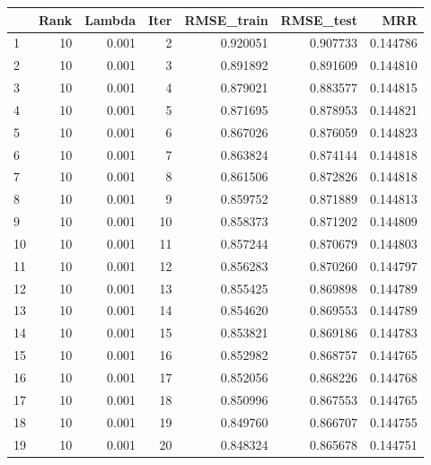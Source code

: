 \begin{tabular}{lrrrrrr}
\toprule
{} &  Rank &  Lambda &  Iter &  RMSE\_train &  RMSE\_test &       MRR \\
\midrule
1  &    10 &   0.001 &     2 &    0.920051 &   0.907733 &  0.144786 \\
2  &    10 &   0.001 &     3 &    0.891892 &   0.891609 &  0.144810 \\
3  &    10 &   0.001 &     4 &    0.879021 &   0.883577 &  0.144815 \\
4  &    10 &   0.001 &     5 &    0.871695 &   0.878953 &  0.144821 \\
5  &    10 &   0.001 &     6 &    0.867026 &   0.876059 &  0.144823 \\
6  &    10 &   0.001 &     7 &    0.863824 &   0.874144 &  0.144818 \\
7  &    10 &   0.001 &     8 &    0.861506 &   0.872826 &  0.144818 \\
8  &    10 &   0.001 &     9 &    0.859752 &   0.871889 &  0.144813 \\
9  &    10 &   0.001 &    10 &    0.858373 &   0.871202 &  0.144809 \\
10 &    10 &   0.001 &    11 &    0.857244 &   0.870679 &  0.144803 \\
11 &    10 &   0.001 &    12 &    0.856283 &   0.870260 &  0.144797 \\
12 &    10 &   0.001 &    13 &    0.855425 &   0.869898 &  0.144789 \\
13 &    10 &   0.001 &    14 &    0.854620 &   0.869553 &  0.144789 \\
14 &    10 &   0.001 &    15 &    0.853821 &   0.869186 &  0.144783 \\
15 &    10 &   0.001 &    16 &    0.852982 &   0.868757 &  0.144765 \\
16 &    10 &   0.001 &    17 &    0.852056 &   0.868226 &  0.144768 \\
17 &    10 &   0.001 &    18 &    0.850996 &   0.867553 &  0.144765 \\
18 &    10 &   0.001 &    19 &    0.849760 &   0.866707 &  0.144755 \\
19 &    10 &   0.001 &    20 &    0.848324 &   0.865678 &  0.144751 \\
\bottomrule
\end{tabular}
